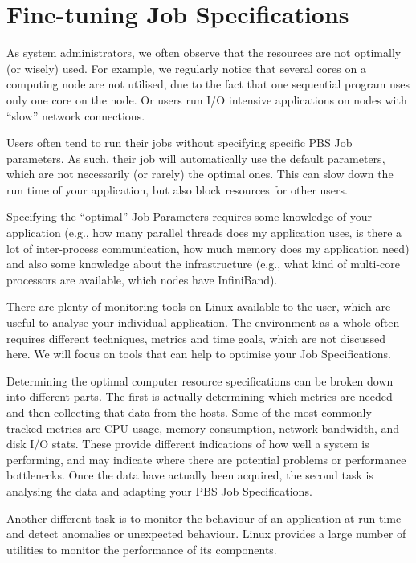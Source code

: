 \chapter{Fine-tuning Job Specifications}
\label{ch:fine-tuning-job-specifications}

As \hpc system administrators, we often observe that the \hpc resources are
not optimally (or wisely) used. For example, we regularly notice that several
cores on a computing node are not utilised, due to the fact that one sequential
program uses only one core on the node. Or users run I/O intensive applications
on nodes with ``slow'' network connections.

Users often tend to run their jobs without specifying specific PBS Job
parameters.  As such, their job will automatically use the default parameters,
which are not necessarily (or rarely) the optimal ones.  This can slow down the
run time of your application, but also block \hpc resources for other users.

Specifying the ``optimal'' Job Parameters requires some knowledge of your
application (e.g., how many parallel threads does my application uses, is there
a lot of inter-process communication, how much memory does my application need)
and also some knowledge about the \hpc infrastructure (e.g., what kind of
multi-core processors are available, which nodes have InfiniBand).

There are plenty of monitoring tools on Linux available to the user, which are
useful to analyse your individual application. The \hpc environment as a
whole often requires different techniques, metrics and time goals, which are
not discussed here. We will focus on tools that can help to optimise your Job
Specifications.

Determining the optimal computer resource specifications can be broken down
into different parts. The first is actually determining which metrics are
needed and then collecting that data from the hosts. Some of the most commonly
tracked metrics are CPU usage, memory consumption, network bandwidth, and disk
I/O stats. These provide different indications of how well a system is
performing, and may indicate where there are potential problems or performance
bottlenecks. Once the data have actually been acquired, the second task is
analysing the data and adapting your PBS Job Specifications.

Another different task is to monitor the behaviour of an application at run time and
detect anomalies or unexpected behaviour. Linux provides a large number of
utilities to monitor the performance of its components.

